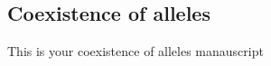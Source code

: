 \begin{refsection}
\chapter{Coexistence of alleles} %
\label{Coexistence_alleles}

This is your coexistence of alleles manauscript

\end{refsection}
